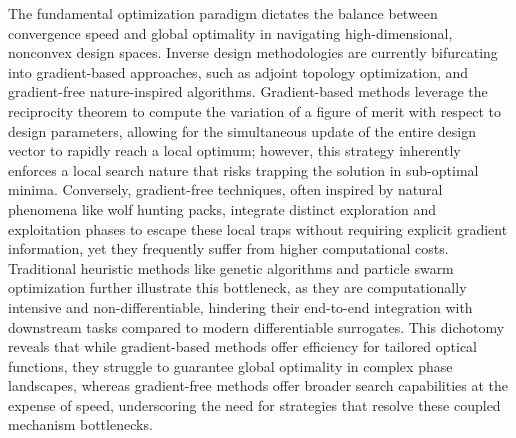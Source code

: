 The fundamental optimization paradigm dictates the balance between convergence speed and global optimality in navigating high-dimensional, nonconvex design spaces. Inverse design methodologies are currently bifurcating into gradient-based approaches, such as adjoint topology optimization, and gradient-free nature-inspired algorithms. Gradient-based methods leverage the reciprocity theorem to compute the variation of a figure of merit with respect to design parameters, allowing for the simultaneous update of the entire design vector to rapidly reach a local optimum; however, this strategy inherently enforces a local search nature that risks trapping the solution in sub-optimal minima. Conversely, gradient-free techniques, often inspired by natural phenomena like wolf hunting packs, integrate distinct exploration and exploitation phases to escape these local traps without requiring explicit gradient information, yet they frequently suffer from higher computational costs. Traditional heuristic methods like genetic algorithms and particle swarm optimization further illustrate this bottleneck, as they are computationally intensive and non-differentiable, hindering their end-to-end integration with downstream tasks compared to modern differentiable surrogates. This dichotomy reveals that while gradient-based methods offer efficiency for tailored optical functions, they struggle to guarantee global optimality in complex phase landscapes, whereas gradient-free methods offer broader search capabilities at the expense of speed, underscoring the need for strategies that resolve these coupled mechanism bottlenecks. \citep{s2_2516273dc5b4511c838bf9236a61f71f4e32f6b5_1724698f} \citep{doi_10_1088_1367_2630_acfcd6_32444f17} \citep{s2_76a83ea3baed75ad88b7f0782eb9a694a330c853_cee16cac}

